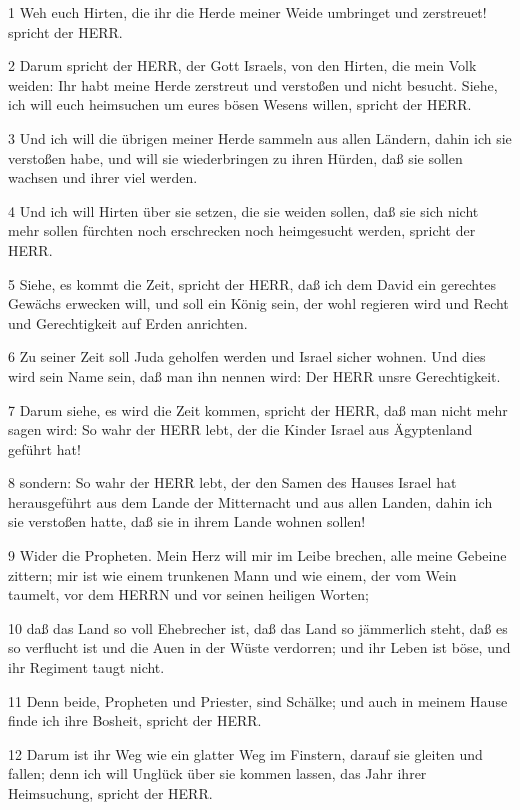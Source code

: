 \par 1 Weh euch Hirten, die ihr die Herde meiner Weide umbringet und zerstreuet! spricht der HERR.
\par 2 Darum spricht der HERR, der Gott Israels, von den Hirten, die mein Volk weiden: Ihr habt meine Herde zerstreut und verstoßen und nicht besucht. Siehe, ich will euch heimsuchen um eures bösen Wesens willen, spricht der HERR.
\par 3 Und ich will die übrigen meiner Herde sammeln aus allen Ländern, dahin ich sie verstoßen habe, und will sie wiederbringen zu ihren Hürden, daß sie sollen wachsen und ihrer viel werden.
\par 4 Und ich will Hirten über sie setzen, die sie weiden sollen, daß sie sich nicht mehr sollen fürchten noch erschrecken noch heimgesucht werden, spricht der HERR.
\par 5 Siehe, es kommt die Zeit, spricht der HERR, daß ich dem David ein gerechtes Gewächs erwecken will, und soll ein König sein, der wohl regieren wird und Recht und Gerechtigkeit auf Erden anrichten.
\par 6 Zu seiner Zeit soll Juda geholfen werden und Israel sicher wohnen. Und dies wird sein Name sein, daß man ihn nennen wird: Der HERR unsre Gerechtigkeit.
\par 7 Darum siehe, es wird die Zeit kommen, spricht der HERR, daß man nicht mehr sagen wird: So wahr der HERR lebt, der die Kinder Israel aus Ägyptenland geführt hat!
\par 8 sondern: So wahr der HERR lebt, der den Samen des Hauses Israel hat herausgeführt aus dem Lande der Mitternacht und aus allen Landen, dahin ich sie verstoßen hatte, daß sie in ihrem Lande wohnen sollen!
\par 9 Wider die Propheten. Mein Herz will mir im Leibe brechen, alle meine Gebeine zittern; mir ist wie einem trunkenen Mann und wie einem, der vom Wein taumelt, vor dem HERRN und vor seinen heiligen Worten;
\par 10 daß das Land so voll Ehebrecher ist, daß das Land so jämmerlich steht, daß es so verflucht ist und die Auen in der Wüste verdorren; und ihr Leben ist böse, und ihr Regiment taugt nicht.
\par 11 Denn beide, Propheten und Priester, sind Schälke; und auch in meinem Hause finde ich ihre Bosheit, spricht der HERR.
\par 12 Darum ist ihr Weg wie ein glatter Weg im Finstern, darauf sie gleiten und fallen; denn ich will Unglück über sie kommen lassen, das Jahr ihrer Heimsuchung, spricht der HERR.
